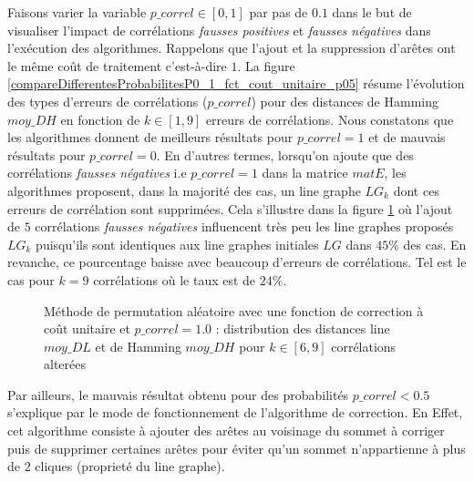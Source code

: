 \documentclass[onecolumn, 12pt]{book}
\begin{document}
Faisons varier la variable $p\_correl \in [0,1]$ par pas de $0.1$ dans le but de visualiser l'impact de corr\'elations {\em fausses positives} et {\em fausses n\'egatives} dans l'ex\'ecution des algorithmes. Rappelons que l'ajout et la suppression d'ar\^etes ont le m\^eme co\^ut de traitement c'est-\`a-dire $1$.
La figure \ref{compareDifferentesProbabilitesP0_1_fct_cout_unitaire_p05} r\'esume l'\'evolution des types d'erreurs de corr\'elations ($p\_correl$) pour des distances de Hamming $moy\_DH$ en fonction de  $k \in [1, 9]$  erreurs de corr\'elations.
\newline 
Nous constatons que les algorithmes donnent de meilleurs r\'esultats pour $p\_correl = 1$ et de mauvais r\'esultats pour $p\_correl = 0$. 
En d'autres termes, lorsqu'on ajoute que des corr\'elations {\em fausses n\'egatives} i.e $p\_correl  = 1$ dans la matrice $matE$, les algorithmes  proposent, dans la majorit\'e des cas, un line graphe $LG_k$ dont ces erreurs de corr\'elation sont supprim\'ees. Cela s'illustre dans la figure \ref{permut_distanceMoyenDLDH_k_5_9_aleatoire_p_10} o\`u l'ajout de $5$ corr\'elations {\em fausses n\'egatives} influencent tr\`es peu les line graphes propos\'es $LG_{k}$ puisqu'ils sont identiques aux line graphes initiales $LG$ dans $45\%$ des cas. 
En revanche, ce pourcentage baisse avec beaucoup d'erreurs de corr\'elations. Tel est le cas pour $k = 9$ corr\'elations o\`u le taux est de $24\%$. 
\begin{figure}[htb!] 
\centering
\caption{ M\'ethode de permutation al\'eatoire avec une fonction de correction \`a co\^ut unitaire et $p\_correl = 1.0$ : distribution des distances line $moy\_DL$ et de Hamming $moy\_DH$ pour $k \in [6,  9]$ corr\'elations alter\'ees}
\label{permut_distanceMoyenDLDH_k_5_9_aleatoire_p_10} 
\end{figure}
\newline
Par ailleurs, le mauvais r\'esultat obtenu pour des probabilit\'es $p\_correl < 0.5$ s'explique par le mode de fonctionnement de l'algorithme de correction. En Effet, cet algorithme consiste \`a ajouter des ar\^etes au voisinage du sommet \`a corriger puis de supprimer certaines ar\^etes pour \'eviter qu'un sommet n'appartienne \`a plus de $2$ cliques (propriet\'e du line graphe).
\newline
\end{document}
